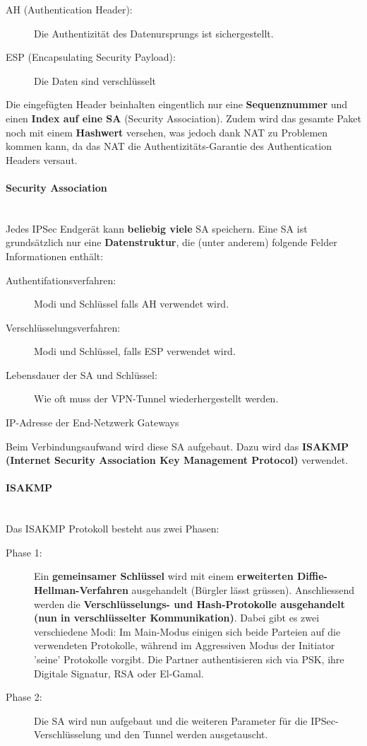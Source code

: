 \documentclass[a4paper, 11pt]{article}
\begin{document}
\begin{description}
	\item[AH (Authentication Header): ] Die Authentizität des Datenursprungs ist sichergestellt.
	\item[ESP (Encapsulating Security Payload): ] Die Daten sind verschlüsselt
\end{description}

Die eingefügten Header beinhalten eingentlich nur eine \textbf{Sequenznummer} und einen \textbf{Index auf eine SA} (Security Association). Zudem wird das gesamte Paket noch mit einem \textbf{Hashwert} versehen, was jedoch dank NAT zu Problemen kommen kann, da das NAT die Authentizitäts-Garantie des Authentication Headers versaut.

\paragraph{Security Association} \mbox{} \\
Jedes IPSec Endgerät kann \textbf{beliebig viele} SA speichern. Eine SA ist grundsätzlich nur eine \textbf{Datenstruktur}, die (unter anderem) folgende Felder Informationen enthält:

\begin{description}
	\item[Authentifationsverfahren: ] Modi und Schlüssel falls AH verwendet wird.
	\item[Verschlüsselungsverfahren: ] Modi und Schlüssel, falls ESP verwendet wird.
	\item[Lebensdauer der SA und Schlüssel: ] Wie oft muss der VPN-Tunnel wiederhergestellt werden.
	\item[IP-Adresse der End-Netzwerk Gateways]
\end{description}

\noindent Beim Verbindungsaufwand wird diese SA aufgebaut. Dazu wird das \textbf{ISAKMP (Internet Security Association Key Management Protocol)} verwendet. 

\paragraph{ISAKMP}\mbox{} \\
 Das ISAKMP Protokoll besteht aus zwei Phasen:
\begin{description}
	\item[Phase 1: ] Ein \textbf{gemeinsamer Schlüssel} wird mit einem \textbf{erweiterten Diffie-Hellman-Verfahren} ausgehandelt (Bürgler lässt grüssen). Anschliessend werden die \textbf{Verschlüsselungs- und Hash-Protokolle ausgehandelt (nun in verschlüsselter Kommunikation)}. Dabei gibt es zwei verschiedene Modi: Im Main-Modus einigen sich beide Parteien auf die verwendeten Protokolle, während im Aggressiven Modus der Initiator 'seine' Protokolle vorgibt. Die Partner authentisieren sich via PSK, ihre Digitale Signatur, RSA oder El-Gamal.
	\item[Phase 2: ] Die SA wird nun aufgebaut und die weiteren Parameter für die IPSec-Verschlüsselung und den Tunnel werden ausgetauscht.
\end{description}
\end{document}
